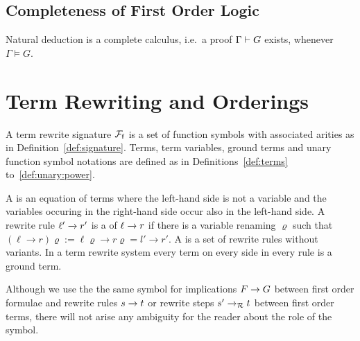 
\subsection{Completeness of First Order Logic}



\begin{theorem}
	Natural deduction is a complete calculus,
	i.e.~a proof \( \Gamma\vdash G \) exists,
	whenever \( \Gamma\models G \).
\end{theorem}


\section{Term Rewriting and Orderings}\label{sec:termrewriting}

\begin{definition}\label{def:rewrite:signature}
	A term rewrite signature \( {\mathcal{F}_{\mathsf{f}}} \) is a set of function symbols
	with associated arities
	as in Definition~\ref{def:signature}.
	Terms, term variables, ground terms and unary function symbol notations
	are defined as in Definitions~\ref{def:terms} to~\ref{def:unary:power}.
\end{definition}


\begin{definition}\label{def:rewriterule}
	A  is an equation of terms where the left-hand side is not a variable
	and the variables occuring in the right-hand side occur also in the left-hand side.
	A rewrite rule \( \ell'\xrightarrow[{}]{} r' \) is a  of \( \ell\xrightarrow[{}]{} r \) if there is a variable renaming \( \varrho \)
	such that
	\( (\ell\rightarrow r)\varrho := \ell\varrho\rightarrow r\varrho = l'\rightarrow r' \).
	A  is a set of rewrite rules without variants.
	In a  term rewrite system every term on every side in every rule is a ground term.
\end{definition}

Although we use the the same symbol for implications \( F\rightarrow G \) between first order formulae
and rewrite rules \( s\xrightarrow[{}]{} t \) or rewrite steps \( s'\xrightarrow[{}]{}_{\mathcal{R}} t \) between first order terms,
there will not arise any ambiguity for the reader about the role of the symbol.

